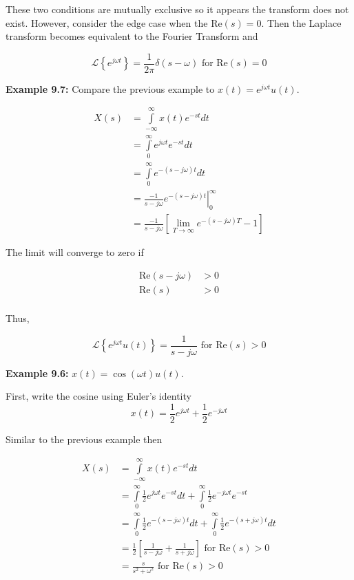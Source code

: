 \documentclass{article}
\begin{document}
These two conditions are mutually exclusive so it appears the transform does not exist. However, consider the edge case when the $\text{Re}(s) = 0$. Then the Laplace transform becomes equivalent to the Fourier Transform and

\[
\mathcal{L}\left\{e^{j\omega t}\right\} = \frac{1}{2\pi} \delta(s - \omega) \text{ for Re}(s) = 0 
\]


\textbf{Example 9.7:} Compare the previous example to $x(t) = e^{j\omega t}u(t)$.

\begin{align}
  X(s) &= \int\limits_{-\infty}^{\infty} x(t) e^{-st} dt\\
  &= \int\limits_{0}^{\infty} e^{j\omega t} e^{-st} dt\\
  &= \int\limits_{0}^{\infty} e^{-(s-j\omega)t} dt\\
  &= \frac{-1}{s-j\omega} \left. e^{-(s-j\omega)t} \right|_{0}^{\infty}\\
  &= \frac{-1}{s-j\omega} \left[ \lim_{T\rightarrow \infty} e^{-(s-j\omega)T} -  1 \right]
\end{align}

The limit will converge to zero if

\begin{align}
  \text{Re}(s-j\omega) &> 0\\
  \text{Re}(s) &> 0\\
\end{align}

Thus,

\[
\mathcal{L}\left\{e^{j\omega t}u(t)\right\} = \frac{1}{s-j\omega} \text{ for Re}(s) > 0 
\]

\textbf{Example 9.6:} $x(t) = \cos(\omega t)u(t)$.

First, write the cosine using Euler's identity
\[
x(t) = \frac{1}{2}e^{j\omega t} + \frac{1}{2}e^{-j\omega t} 
\]

Similar to the previous example then

\begin{align}
  X(s) &= \int\limits_{-\infty}^{\infty} x(t) e^{-st} dt\\
  &= \int\limits_{0}^{\infty} \frac{1}{2}e^{j\omega t} e^{-st} dt + \int\limits_{0}^{\infty} \frac{1}{2}e^{-j\omega t} e^{-st}\\
  &= \int\limits_{0}^{\infty} \frac{1}{2}e^{-(s-j\omega)t} dt + \int\limits_{0}^{\infty} \frac{1}{2}e^{-(s+j\omega)t} dt\\
  &= \frac{1}{2} \left[ \frac{1}{s-j\omega} + \frac{1}{s+j\omega}\right] \text{ for Re}(s) > 0\\
  &= \frac{s}{s^2 + \omega^2} \text{ for Re}(s) > 0 
\end{align}
\end{document}
